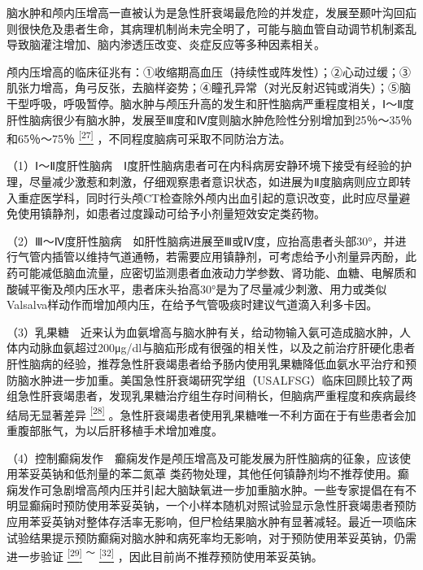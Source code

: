脑水肿和颅内压增高一直被认为是急性肝衰竭最危险的并发症，发展至颞叶沟回疝则很快危及患者生命，其病理机制尚未完全明了，可能与脑血管自动调节机制紊乱导致脑灌注增加、脑内渗透压改变、炎症反应等多种因素相关。

颅内压增高的临床征兆有：①收缩期高血压（持续性或阵发性）；②心动过缓；③肌张力增高，角弓反张，去脑样姿势；④瞳孔异常（对光反射迟钝或消失）；⑤脑干型呼吸，呼吸暂停。脑水肿与颅压升高的发生和肝性脑病严重程度相关，Ⅰ～Ⅱ度肝性脑病很少有脑水肿，发展至Ⅲ度和Ⅳ度则脑水肿危险性分别增加到25％～35％和65％～75％
\protect\hyperlink{text00019.htmlux5cux23ch27-18}{\textsuperscript{{[}27{]}}}
，不同程度脑病可采取不同防治方法。

（1）Ⅰ～Ⅱ度肝性脑病　Ⅰ度肝性脑病患者可在内科病房安静环境下接受有经验的护理，尽量减少激惹和刺激，仔细观察患者意识状态，如进展为Ⅱ度脑病则应立即转入重症医学科，同时行头颅CT检查除外颅内出血引起的意识改变，此时应尽量避免使用镇静剂，如患者过度躁动可给予小剂量短效安定类药物。

（2）Ⅲ～Ⅳ度肝性脑病　如肝性脑病进展至Ⅲ或Ⅳ度，应抬高患者头部30°，并进行气管内插管以维持气道通畅，若需要应用镇静剂，可考虑给予小剂量异丙酚，此药可能减低脑血流量，应密切监测患者血液动力学参数、肾功能、血糖、电解质和酸碱平衡及颅内压水平，患者床头抬高30°是为了尽量减少刺激、用力或类似Valsalva样动作而增加颅内压，在给予气管吸痰时建议气道滴入利多卡因。

（3）乳果糖　近来认为血氨增高与脑水肿有关，给动物输入氨可造成脑水肿，人体内动脉血氨超过200μg/dl与脑疝形成有很强的相关性，以及之前治疗肝硬化患者肝性脑病的经验，推荐急性肝衰竭患者给予肠内使用乳果糖降低血氨水平治疗和预防脑水肿进一步加重。美国急性肝衰竭研究学组（USALFSG）临床回顾比较了两组急性肝衰竭患者，发现乳果糖治疗组生存时间稍长，但脑病严重程度和疾病最终结局无显著差异
\protect\hyperlink{text00019.htmlux5cux23ch28-18}{\textsuperscript{{[}28{]}}}
。急性肝衰竭患者使用乳果糖唯一不利方面在于有些患者会加重腹部胀气，为以后肝移植手术增加难度。

（4）控制癫痫发作　癫痫发作是颅压增高及可能发展为肝性脑病的征象，应该使用苯妥英钠和低剂量的苯二氮䓬
类药物处理，其他任何镇静剂均不推荐使用。癫痫发作可急剧增高颅内压并引起大脑缺氧进一步加重脑水肿。一些专家提倡在有不明显癫痫时预防使用苯妥英钠，一个小样本随机对照试验显示急性肝衰竭患者预防应用苯妥英钠对整体存活率无影响，但尸检结果脑水肿有显著减轻。最近一项临床试验结果提示预防癫痫对脑水肿和病死率均无影响，对于预防使用苯妥英钠，仍需进一步验证
\protect\hyperlink{text00019.htmlux5cux23ch29-18}{\textsuperscript{{[}29{]}}}
\textsuperscript{～}
\protect\hyperlink{text00019.htmlux5cux23ch32-18}{\textsuperscript{{[}32{]}}}
，因此目前尚不推荐预防使用苯妥英钠。

